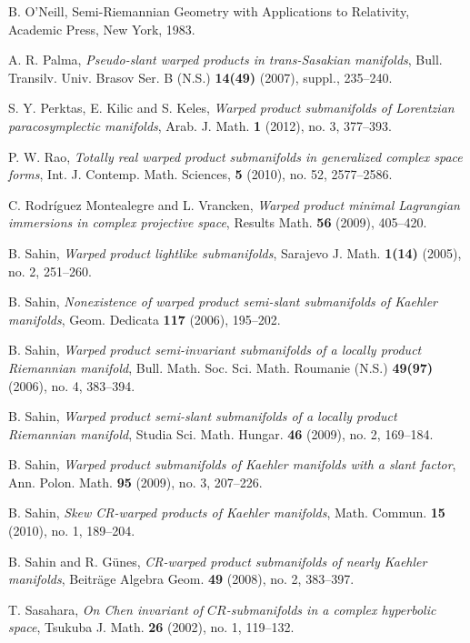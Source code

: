 \documentclass{amsart}
\theoremstyle{plain}
\numberwithin{equation}{section}
\theoremstyle{remark}
\numberwithin{equation}{section}
\begin{document}
\begin{thebibliography}{120}
 B. O'Neill,  {Semi-Riemannian Geometry with Applications to Relativity}, Academic Press, New York, 1983.

 A. R. Palma, {\it Pseudo-slant warped products in trans-Sasakian manifolds},  Bull. Transilv. Univ. Brasov Ser. B (N.S.) {\bf 14(49)} (2007), suppl., 235--240.

 S. Y. Perktas, E. Kilic and S. Keles, {\it Warped product submanifolds of Lorentzian paracosymplectic manifolds}, Arab. J. Math. {\bf 1} (2012), no. 3, 377--393.

 P. W. Rao, {\it Totally real warped product submanifolds in generalized complex space forms}, Int. J. Contemp. Math. Sciences, {\bf 5} (2010), no. 52, 2577--2586.

  C. Rodr\'iguez Montealegre and L. Vrancken, {\it Warped product minimal Lagrangian immersions in complex projective space}, Results Math. {\bf 56} (2009), 405--420.

 B. Sahin, {\it  Warped product lightlike submanifolds}, Sarajevo J. Math. {\bf 1(14)} (2005), no. 2, 251--260.

 B. Sahin, {\it  Nonexistence of warped product semi-slant submanifolds of Kaehler manifolds}, Geom. Dedicata {\bf 117} (2006), 195--202.

 B. Sahin, {\it  Warped product semi-invariant submanifolds of a locally product Riemannian manifold}, Bull. Math. Soc. Sci. Math. Roumanie (N.S.) {\bf 49(97)} (2006), no. 4, 383--394.

 B. Sahin, {\it Warped product semi-slant submanifolds of a locally product Riemannian manifold}, Studia Sci. Math. Hungar. {\bf 46} (2009), no. 2, 169--184.

 B. Sahin, {\it  Warped product submanifolds of Kaehler manifolds with a slant factor},  Ann. Polon. Math. {\bf 95} (2009), no. 3, 207--226.

 B. Sahin, {\it Skew CR-warped products of Kaehler manifolds}, Math. Commun. {\bf 15} (2010), no. 1, 189--204.

 B. Sahin and R. G\"unes, {\it  CR-warped product submanifolds of nearly Kaehler manifolds}, Beitr\"age Algebra Geom. {\bf 49} (2008), no. 2, 383--397.

  T. Sasahara,  {\it On Chen invariant of $CR$-submanifolds in a complex hyperbolic space}, Tsukuba J. Math. {\bf 26} (2002), no. 1, 119--132.


\end{thebibliography}
\end{document}
